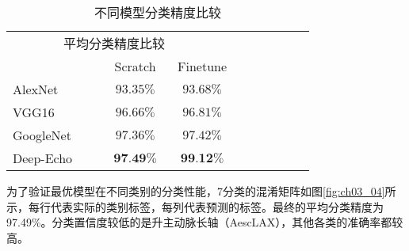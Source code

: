\begin{table}[!htbp]
    \centering
    \footnotesize%
    \setlength{\tabcolsep}{4pt}%
    \renewcommand{\arraystretch}{1.2}%
    \begin{tabular}{lcccccccc}
        \hline\hline
          \multicolumn{2}{c}{\ \ \ \ \ \ \ \ \quad 平均分类精度比较} \\
        \cline{2-3}%
           \qquad  & Scratch & Finetune \\
        \hline
        AlexNet & $93.35\%$ & $93.68\%$ \\
        \hline
        VGG16 & $96.66\%$ & $96.81\%$ \\
        \hline
        GoogleNet & $97.36\%$ & $97.42\%$ \\
        \hline
        Deep-Echo & $\textbf{97.49\%}$ & $\textbf{99.12\%}$ \\
        \hline\hline
    \end{tabular}
    \caption{不同模型分类精度比较}
    \label{tab:ch03_01}
\end{table}

为了验证最优模型在不同类别的分类性能，7分类的混淆矩阵如图\ref{fig:ch03_04}所示，每行代表实际的类别标签，每列代表预测的标签。最终的平均分类精度为97.49\%。分类置信度较低的是升主动脉长轴（AescLAX），其他各类的准确率都较高。

